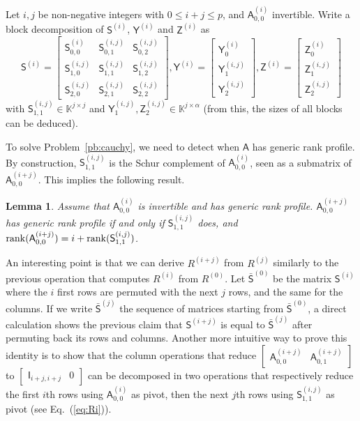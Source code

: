 \documentclass{sig-alternate}
\newcommand{\mA}{\ensuremath{\mathsf{A}}}
\newcommand{\mI}{\ensuremath{\mathsf{I}}}
\newcommand{\mS}{\ensuremath{\mathsf{S}}}
\newcommand{\mY}{\ensuremath{\mathsf{Y}}}
\newcommand{\mZ}{\ensuremath{\mathsf{Z}}}
\newcommand{\K}{\ensuremath{\mathbb{K}}}
\newtheorem{lemma}[definition]{Lemma}
\begin{document}
Let $i,j$ be non-negative integers with $0 \le i+j \le p$, and
${\mA^{(i)}_{0,0}}$ invertible. Write a block decomposition of $\mS^{(i)}$, $\mY^{(i)}$ and
$\mZ^{(i)}$ as
\begin{equation*}
\mS^{(i)} = \begin{bmatrix} 
\mS^{(i)}_{0,0} & \mS^{(i,j)}_{0,1} & \mS^{(i,j)}_{0,2}\\
\mS^{(i,j)}_{1,0} & \mS^{(i,j)}_{1,1} & \mS^{(i,j)}_{1,2}\\
\mS^{(i,j)}_{2,0} & \mS^{(i,j)}_{2,1} & \mS^{(i,j)}_{2,2}
    \end{bmatrix},  
\mY^{(i)} = 
\begin{bmatrix}
  \mY^{(i)}_0 \\\mY^{(i,j)}_1 \\\mY^{(i,j)}_2
\end{bmatrix},
\mZ^{(i)} = 
\begin{bmatrix}
  \mZ^{(i)}_0 \\\mZ^{(i,j)}_1 \\\mZ^{(i,j)}_2
\end{bmatrix}
\end{equation*}
with $\mS^{(i,j)}_{1,1} \in \K^{j \times j}$ and
$\mY^{(i,j)}_1, \mZ^{(i,j)}_2 \in \K^{j \times \alpha}$ (from this,
the sizes of all blocks can be deduced).

To solve Problem~\ref{pb:cauchy}, we need to detect when $\mA$ has
generic rank profile. By construction, $\mS^{(i,j)}_{1,1}$ is the
Schur complement of ${\mA^{(i)}_{0,0}}$, seen as a submatrix of
$\mA^{(i+j)}_{0,0}$. This implies the following result.

\begin{lemma}\label{lemma:update}
  Assume that $\mA^{(i)}_{0,0}$ is invertible and has generic rank
  profile.
  $\mA^{(i+j)}_{0,0}$ has generic rank profile if and only if
  $\mS^{(i,j)}_{1,1}$ does, and
  ${\rm rank}(\mA^{(i+j)}_{0,0})=i+{\rm rank}(\mS^{(i,j)}_{1,1})$. 
\end{lemma}

An interesting point is that we can derive $R^{(i+j)}$ from $R^{(j)}$
similarly to the previous operation that computes $R^{(i)}$ from
$R^{(0)}$. Let $\bar{\mS}^{(0)}$ be the matrix $\mS^{(i)}$ where the
$i$ first rows are permuted with the next $j$ rows, and the same for
the columns. If we write $\bar{\mS}^{(j)}$ the sequence of matrices
starting from $\bar{\mS}^{(0)}$, a direct calculation shows the
previous claim that $\mS^{(i+j)}$ is equal to $\bar{\mS}^{(j)}$ after
permuting back its rows and columns. Another more intuitive way to
prove this identity is to show that the column operations that reduce
$\begin{bmatrix} \mA^{(i+j)}_{0,0} & \mA^{(i+j)}_{0,1} \end{bmatrix}$
to $\begin{bmatrix} \mI_{i+j,i+j} & 0 \end{bmatrix}$ can be decomposed
in two operations that respectively reduce the first $i$th rows using
$\mA^{(i)}_{0,0}$ as pivot, then the next $j$th rows using
$\mS^{(i,j)}_{1,1}$ as pivot (see Eq.~(\ref{eq:Ri})).
\end{document}
